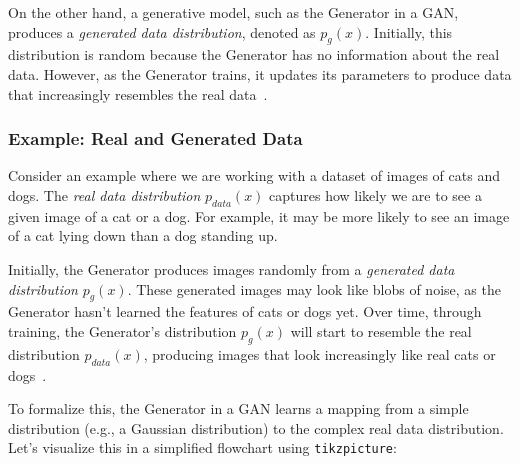 On the other hand, a generative model, such as the Generator in a GAN, produces a \textit{generated data distribution}, denoted as \( p_{g}(x) \). Initially, this distribution is random because the Generator has no information about the real data. However, as the Generator trains, it updates its parameters to produce data that increasingly resembles the real data~\cite{goodfellow2014generative}.

\subsubsection{Example: Real and Generated Data}
Consider an example where we are working with a dataset of images of cats and dogs. The \textit{real data distribution} \( p_{data}(x) \) captures how likely we are to see a given image of a cat or a dog. For example, it may be more likely to see an image of a cat lying down than a dog standing up.

Initially, the Generator produces images randomly from a \textit{generated data distribution} \( p_g(x) \). These generated images may look like blobs of noise, as the Generator hasn't learned the features of cats or dogs yet. Over time, through training, the Generator's distribution \( p_g(x) \) will start to resemble the real distribution \( p_{data}(x) \), producing images that look increasingly like real cats or dogs~\cite{goodfellow2014generative, heusel2017gans, he2018probgan, farnia2020gans}.

To formalize this, the Generator in a GAN learns a mapping from a simple distribution (e.g., a Gaussian distribution) to the complex real data distribution. Let's visualize this in a simplified flowchart using \texttt{tikzpicture}:

\begin{center}
\end{center}

